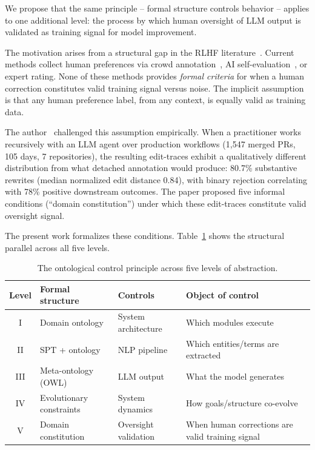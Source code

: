 \documentclass[11pt]{article}
\begin{document}
We propose that the same principle -- formal structure controls behavior -- applies to one additional level: the process by which human oversight of LLM output is validated as training signal for model improvement.

The motivation arises from a structural gap in the RLHF literature~\citep{christiano2017deep, ouyang2022training}.
Current methods collect human preferences via crowd annotation~\citep{ouyang2022training}, AI self-evaluation~\citep{bai2022constitutional, lee2023rlaif}, or expert rating.
None of these methods provides \emph{formal criteria} for when a human correction constitutes valid training signal versus noise.
The implicit assumption is that any human preference label, from any context, is equally valid as training data.

The author~\citep{ovcharov2025citation,ovcharov2025statute} challenged this assumption empirically.
When a practitioner works recursively with an LLM agent over production workflows (1{,}547 merged PRs, 105 days, 7 repositories), the resulting edit-traces exhibit a qualitatively different distribution from what detached annotation would produce: 80.7\% substantive rewrites (median normalized edit distance 0.84), with binary rejection correlating with 78\% positive downstream outcomes.
The paper proposed five informal conditions (``domain constitution'') under which these edit-traces constitute valid oversight signal.

The present work formalizes these conditions.
Table~\ref{tab:levels} shows the structural parallel across all five levels.

\begin{table}[h]
\centering
\caption{The ontological control principle across five levels of abstraction.}
\label{tab:levels}
\begin{tabular}{@{}cp{3.5cm}p{3.5cm}p{3.5cm}@{}}
\toprule
\textbf{Level} & \textbf{Formal structure} & \textbf{Controls} & \textbf{Object of control} \\
\midrule
I   & Domain ontology          & System architecture     & Which modules execute \\
II  & SPT + ontology           & NLP pipeline            & Which entities/terms are extracted \\
III & Meta-ontology (OWL)      & LLM output              & What the model generates \\
IV  & Evolutionary constraints & System dynamics          & How goals/structure co-evolve \\
V   & Domain constitution      & Oversight validation     & When human corrections are valid training signal \\
\bottomrule
\end{tabular}
\end{table}
\end{document}
